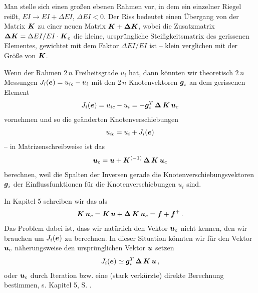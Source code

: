 Man stelle sich einen gro{\ss}en ebenen Rahmen vor, in dem ein einzelner Riegel rei{\ss}t, $EI \to EI + \Delta EI$, $\Delta EI < 0$. Der Riss bedeutet einen \"{U}bergang von der Matrix $\mbox{\boldmath $K$}$ zu einer neuen Matrix $\mbox{\boldmath $K$} + \mbox{\boldmath $\Delta$} \mbox{\boldmath $K$}$, wobei die Zusatzmatrix $\mbox{\boldmath $\Delta$} \mbox{\boldmath $K$} = \Delta EI/EI \cdot \mbox{\boldmath $K$}_e$ die kleine, urspr\"{u}ngliche Steifigkeitsmatrix des gerissenen Elementes, gewichtet mit dem Faktor $\Delta EI/EI$ ist -- klein verglichen mit der Gr\"{o}{\ss}e von $\mbox{\boldmath $K$}$.

Wenn der Rahmen $2\,n$ Freiheitsgrade $u_i$ hat, dann k\"{o}nnten wir theoretisch $2\,n$ Messungen $J_i(\mbox{\boldmath $e$}) = u_{ic} - u_i$ mit den $2\,n$ Knotenvektoren $\mbox{\boldmath $g$}_i$ an dem gerissenen Element
\begin{align}
J_i(\mbox{\boldmath $e$}) = u_{ic} - u_i = -\mbox{\boldmath $g$}_i^T\,\mbox{\boldmath $\Delta$}\,\mbox{\boldmath $K$}\,\mbox{\boldmath $u$}_c
\end{align}
vornehmen und so die ge\"{a}nderten Knotenverschiebungen
\begin{align}
u_{ic} = u_i + J_i(\mbox{\boldmath $e$})
\end{align}
-- in Matrizenschreibweise ist das
\begin{align}\label{Eq161}
\mbox{\boldmath $u$}_c = \mbox{\boldmath $u$} + \mbox{\boldmath $K$}^{(-1)}\,\mbox{\boldmath $\Delta$}\,\mbox{\boldmath $K$}\,\mbox{\boldmath $u$}_c
\end{align}
berechnen, weil die Spalten der Inversen gerade die Knotenverschiebungsvektoren $\mbox{\boldmath $g$}_i$ der Einflussfunktionen f\"{u}r die Knotenverschiebungen $u_i$ sind.

In Kapitel 5 schreiben wir das als
\begin{align}\label{Eq7}
\mbox{\boldmath $K$}\,\mbox{\boldmath $u$}_c = \mbox{\boldmath $K$}\,\mbox{\boldmath $u$} + \mbox{\boldmath $\Delta$}\,\mbox{\boldmath $K$}\,\mbox{\boldmath $u$}_c = \mbox{\boldmath $f$} + \mbox{\boldmath $f$}^+\,.
\end{align}
Das Problem dabei ist, dass wir nat\"{u}rlich den Vektor $\mbox{\boldmath $u$}_c$ nicht kennen, den wir brauchen um $J_i(\mbox{\boldmath $e$})$ zu berechnen. In dieser Situation k\"{o}nnten wir f\"{u}r den Vektor $\mbox{\boldmath $u$}_c$ n\"{a}herungsweise den urspr\"{u}nglichen Vektor $\mbox{\boldmath $u$}$ setzen
\begin{align}
J_i(\mbox{\boldmath $e$})  \simeq \mbox{\boldmath $g$}_i^T\,\mbox{\boldmath $\Delta$}\,\mbox{\boldmath $K$}\,\mbox{\boldmath $u$}\,,
\end{align}
oder $\mbox{\boldmath $u$}_c$ durch Iteration bzw. eine (stark verk\"{u}rzte) direkte Berechnung bestimmen, s. Kapitel 5, S. \pageref{Eq59}. \\

